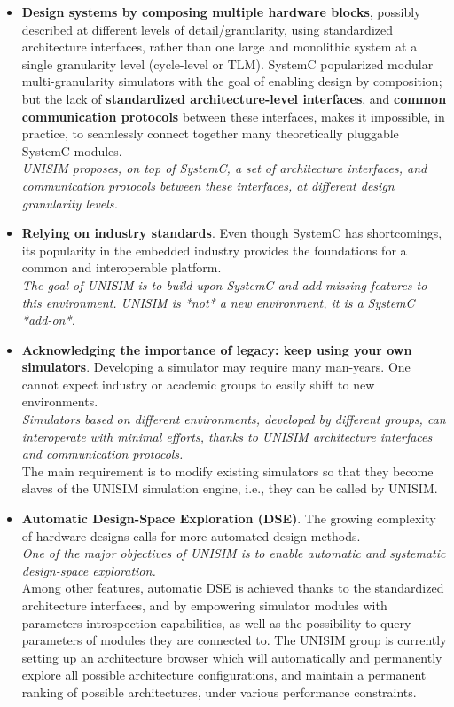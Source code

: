 \begin{itemize}
\item \textbf{Design systems by composing multiple hardware blocks}, possibly described at different levels of detail/granularity, using standardized architecture interfaces, rather than one large and monolithic system at a single granularity level (cycle-level or TLM). SystemC popularized modular multi-granularity simulators with the goal of enabling design by composition; but the lack of \textbf{standardized architecture-level interfaces}, and \textbf{common communication protocols} between these interfaces, makes it impossible, in practice, to seamlessly connect together many theoretically pluggable SystemC modules.\\
\emph{UNISIM proposes, on top of SystemC, a set of architecture interfaces, and communication protocols between these interfaces, at different design granularity levels.}
\item \textbf{Relying on industry standards}. Even though SystemC has shortcomings, its popularity in the embedded industry provides the foundations for a common and interoperable platform.\\
\emph{The goal of UNISIM is to build upon SystemC and add missing features to this environment. UNISIM is *not* a new environment, it is a SystemC *add-on*.}
\item \textbf{Acknowledging the importance of legacy: keep using your own simulators}. Developing a simulator may require many man-years. One cannot expect industry or academic groups to easily shift to new environments.\\
\emph{Simulators based on different environments, developed by different groups, can interoperate with minimal efforts, thanks to UNISIM architecture interfaces and communication protocols.}\\
The main requirement is to modify existing simulators so that they become slaves of the UNISIM simulation engine, i.e., they can be called by UNISIM.
\item \textbf{Automatic Design-Space Exploration (DSE)}. The growing complexity of hardware designs calls for more automated design methods.\\
\emph{One of the major objectives of UNISIM is to enable automatic and systematic design-space exploration.}\\
Among other features, automatic DSE is achieved thanks to the standardized architecture interfaces, and by empowering simulator modules with parameters introspection capabilities, as well as the possibility to query parameters of modules they are connected to. The UNISIM group is currently setting up an architecture browser which will automatically and permanently explore all possible architecture configurations, and maintain a permanent ranking of possible architectures, under various performance constraints.

\end{itemize}

